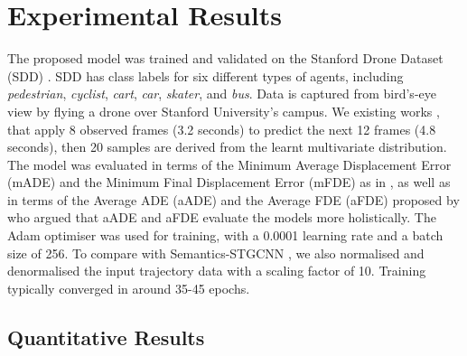 \documentclass{article}
\begin{document}
\section{Experimental Results}
\label{sec:results}

The proposed model was trained and validated on the Stanford Drone Dataset (SDD) \cite{Robicquet2016SDD}.
SDD has class labels for six different types of agents, including \textit{pedestrian}, \textit{cyclist}, \textit{cart}, \textit{car}, \textit{skater}, and \textit{bus}. Data is captured from bird's-eye view by flying a drone over Stanford University's campus. We existing works \cite{shi2021sgcn}, \cite{gupta2018social} that apply 8 observed frames (3.2 seconds) to predict the next 12 frames (4.8 seconds), then 20 samples are derived from the learnt multivariate distribution. The model was evaluated in terms of the Minimum Average Displacement Error (mADE) and the Minimum Final Displacement Error (mFDE) as in \cite{Mohamed2020socialstgcnn}, as well as in terms of the Average ADE (aADE) and the Average FDE (aFDE) proposed by \cite{rainbow2021semanticsstgcnn} who argued that aADE and aFDE evaluate the models more holistically. The Adam \cite{kingma2014method} optimiser was used for training, with a 0.0001 learning rate and a batch size of 256. 
To compare with Semantics-STGCNN \cite{rainbow2021semanticsstgcnn}, we also normalised and denormalised the input trajectory data with a scaling factor of 10. Training typically converged in around 35-45 epochs.


\subsection{Quantitative Results}
\end{document}
